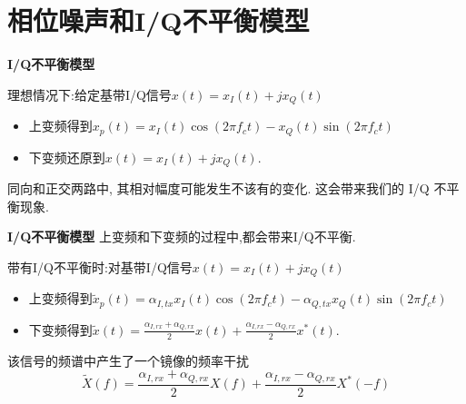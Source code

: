 \section{相位噪声和I/Q不平衡模型}
    
    \frame{\sectionpage}
    
    \begin{frame}{\textbf{I/Q不平衡模型}}
   		\begin{block}{理想情况下:给定基带I/Q信号$x(t) = x_I(t)+jx_Q(t)$}
   		\begin{itemize}
   			\item 上变频得到$x_p(t) = x_I(t)\cos(2\pi f_ct) - x_Q(t)\sin(2\pi f_ct)$
   			\item 下变频还原到$x(t) = x_I(t)+jx_Q(t)$.
   		\end{itemize}
   		\end{block}
   	
   		同向和正交两路中, 其相对幅度可能发生不该有的变化. 这会带来我们的 I/Q 不平衡现象.
   	
	\end{frame}
    
    \begin{frame}{\textbf{I/Q不平衡模型}}
    上变频和下变频的过程中,都会带来I/Q不平衡.
    \begin{block}{带有I/Q不平衡时:对基带I/Q信号$x(t) = x_I(t)+jx_Q(t)$}
    	\begin{itemize}
    		\item 上变频得到$\tilde{x}_p(t) = \alpha_{I,tx}x_I(t)\cos(2\pi f_ct) - \alpha_{Q,tx}x_Q(t)\sin(2\pi f_ct)$
    		\item 下变频得到$\tilde{x}(t) = \frac{\alpha_{I,rx}+\alpha_{Q,rx}}{2}x(t) + \frac{\alpha_{I,rx}-\alpha_{Q,rx}}{2}x^*(t)$.
    	\end{itemize}
    \end{block}
    
   	该信号的频谱中产生了一个镜像的频率干扰
   	\begin{equation}
   		\tilde{X}(f) = \frac{\alpha_{I,rx}+\alpha_{Q,rx}}{2}X(f) +  \frac{\alpha_{I,rx}-\alpha_{Q,rx}}{2} X^*(-f)
   	\end{equation}
    
\end{frame}
    
